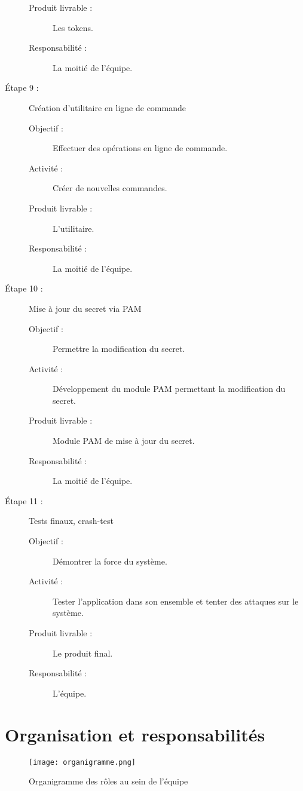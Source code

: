 \documentclass{../../res/univ-projet}
\begin{document}
\begin{description}
\begin{description}
		        \item [Produit livrable :] Les tokens.
		        \item [Responsabilité :] La moitié de l'équipe.
		    \end{description}
	    \item [Étape 9 :] Création d'utilitaire en ligne de commande
		    \begin{description}
		        \item [Objectif :] Effectuer des opérations en ligne de commande.
		        \item [Activité :] Créer de nouvelles commandes.
		        \item [Produit livrable :] L'utilitaire.
		        \item [Responsabilité :] La moitié de l'équipe.
		    \end{description}
	    \item [Étape 10 :] Mise à jour du secret via PAM
		    \begin{description}
		        \item [Objectif :] Permettre la modification du secret.
		        \item [Activité :] Développement du module PAM permettant la modification du secret.
		        \item [Produit livrable :] Module PAM de mise à jour du secret.
		        \item [Responsabilité :] La moitié de l'équipe.
		    \end{description}
	    \item [Étape 11 :] Tests finaux, crash-test
		    \begin{description}
		        \item [Objectif :] Démontrer la force du système.
		        \item [Activité :] Tester l'application dans son ensemble et tenter des attaques sur le système.
		        \item [Produit livrable :] Le produit final.
		        \item [Responsabilité :] L'équipe.
		    \end{description}
    \end{description}
    
\newpage
\section{Organisation et responsabilités}
	\begin{figure}[h!]
		\texttt{[image: organigramme.png]}
		\caption{Organigramme des rôles au sein de l'équipe}
	\end{figure}
	
\end{document}
